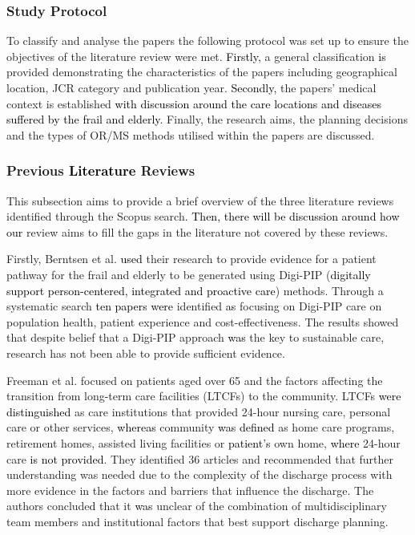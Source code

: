 \documentclass[../thesis.tex]{subfiles}
\begin{document}
\subsubsection{Study Protocol}
To classify and analyse the papers the following protocol was set up to ensure the objectives of the literature review were met. \textcolor{black}{Firstly,} a general classification \textcolor{black}{is} provided demonstrating the characteristics of the papers including geographical location, JCR category and publication year. \textcolor{black}{Secondly,} the papers' medical context is established \textcolor{black}{with discussion around the care locations and diseases suffered by the frail and elderly}. Finally, the research aims, the planning decisions and the types of OR/MS methods utilised within the papers are discussed.

\subsubsection{Previous \textcolor{black}{Literature} Reviews}\label{subsection:pr}
This subsection aims to provide a brief overview of the three literature reviews identified through the Scopus search\textcolor{black}{. Then, there will be discussion around how our} review aims to fill the gaps in the literature not covered by these reviews.

Firstly, Berntsen et al. \cite{Berntsen} \textcolor{black}{used} their research to provide evidence for a patient pathway for the frail and elderly to be generated using Digi-PIP (\textcolor{black}{digitally support person-centered, integrated and proactive care}) methods. Through a systematic search \textcolor{black}{ten papers were} identified \textcolor{black}{as} focusing on Digi-PIP care on population health, patient experience and cost-effectiveness. The results showed that despite belief that a Digi-PIP approach \textcolor{black}{was} the key to sustainable care, research has not been able to provide sufficient evidence.

Freeman et al. \cite{Freeman} focused on patients aged over 65 and the factors affecting the transition from long\textcolor{black}{-}term care facilities (LTCFs) to the community. LTCFs \textcolor{black}{were distinguished} as care institutions that provided 24-hour nursing care, personal care or other services, \textcolor{black}{whereas} community \textcolor{black}{was defined} as home care programs, retirement homes, assisted living facilities or \textcolor{black}{patient's} own home, \textcolor{black}{where} 24-hour care \textcolor{black}{is not provided}. They identified 36 articles and recommended that further understanding was needed due to the complexity of the discharge process with more evidence in the factors and barriers that influence the discharge. The authors conclude\textcolor{black}{d} that it \textcolor{black}{was} unclear of the combination of multidisciplinary team members and institutional factors that best support discharge planning.
\end{document}
